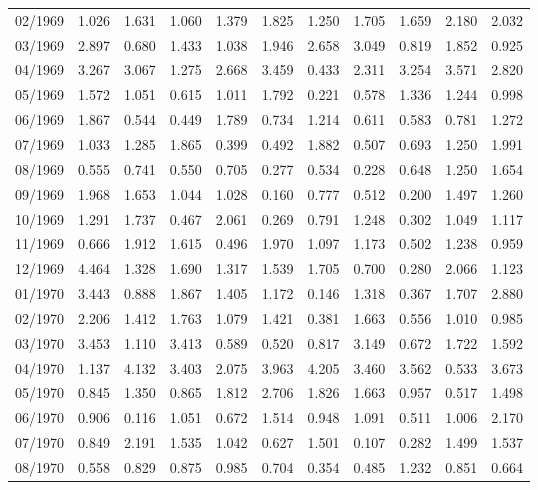 \begin{tabular}{lrrrrrrrrrr}
02/1969 &  1.026 &  1.631 &  1.060 &  1.379 &  1.825 &  1.250 &  1.705 &  1.659 &  2.180 &  2.032 \\
03/1969 &  2.897 &  0.680 &  1.433 &  1.038 &  1.946 &  2.658 &  3.049 &  0.819 &  1.852 &  0.925 \\
04/1969 &  3.267 &  3.067 &  1.275 &  2.668 &  3.459 &  0.433 &  2.311 &  3.254 &  3.571 &  2.820 \\
05/1969 &  1.572 &  1.051 &  0.615 &  1.011 &  1.792 &  0.221 &  0.578 &  1.336 &  1.244 &  0.998 \\
06/1969 &  1.867 &  0.544 &  0.449 &  1.789 &  0.734 &  1.214 &  0.611 &  0.583 &  0.781 &  1.272 \\
07/1969 &  1.033 &  1.285 &  1.865 &  0.399 &  0.492 &  1.882 &  0.507 &  0.693 &  1.250 &  1.991 \\
08/1969 &  0.555 &  0.741 &  0.550 &  0.705 &  0.277 &  0.534 &  0.228 &  0.648 &  1.250 &  1.654 \\
09/1969 &  1.968 &  1.653 &  1.044 &  1.028 &  0.160 &  0.777 &  0.512 &  0.200 &  1.497 &  1.260 \\
10/1969 &  1.291 &  1.737 &  0.467 &  2.061 &  0.269 &  0.791 &  1.248 &  0.302 &  1.049 &  1.117 \\
11/1969 &  0.666 &  1.912 &  1.615 &  0.496 &  1.970 &  1.097 &  1.173 &  0.502 &  1.238 &  0.959 \\
12/1969 &  4.464 &  1.328 &  1.690 &  1.317 &  1.539 &  1.705 &  0.700 &  0.280 &  2.066 &  1.123 \\
01/1970 &  3.443 &  0.888 &  1.867 &  1.405 &  1.172 &  0.146 &  1.318 &  0.367 &  1.707 &  2.880 \\
02/1970 &  2.206 &  1.412 &  1.763 &  1.079 &  1.421 &  0.381 &  1.663 &  0.556 &  1.010 &  0.985 \\
03/1970 &  3.453 &  1.110 &  3.413 &  0.589 &  0.520 &  0.817 &  3.149 &  0.672 &  1.722 &  1.592 \\
04/1970 &  1.137 &  4.132 &  3.403 &  2.075 &  3.963 &  4.205 &  3.460 &  3.562 &  0.533 &  3.673 \\
05/1970 &  0.845 &  1.350 &  0.865 &  1.812 &  2.706 &  1.826 &  1.663 &  0.957 &  0.517 &  1.498 \\
06/1970 &  0.906 &  0.116 &  1.051 &  0.672 &  1.514 &  0.948 &  1.091 &  0.511 &  1.006 &  2.170 \\
07/1970 &  0.849 &  2.191 &  1.535 &  1.042 &  0.627 &  1.501 &  0.107 &  0.282 &  1.499 &  1.537 \\
08/1970 &  0.558 &  0.829 &  0.875 &  0.985 &  0.704 &  0.354 &  0.485 &  1.232 &  0.851 &  0.664 \\

\end{tabular}
